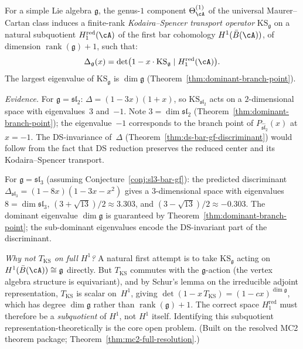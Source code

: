 \begin{conjecture}
\label{conj:discriminant-ks-operator}
For a simple Lie algebra $\mathfrak{g}$, the genus-$1$ component
$\Theta_{\cA}^{(1)}$ of the universal Maurer--Cartan class
induces a finite-rank \emph{Kodaira--Spencer transport operator}
$\mathrm{KS}_{\mathfrak{g}}$ on a natural subquotient
$H^{\mathrm{red}}_1(\cA)$ of the first bar cohomology
$H^1(\bar{B}(\cA))$, of dimension
$\operatorname{rank}(\mathfrak{g}) + 1$, such that:
\begin{equation}\label{eq:discriminant-ks-operator}
\Delta_{\mathfrak{g}}(x)
= \det\bigl(1 - x \cdot \mathrm{KS}_{\mathfrak{g}}
  \mid H^{\mathrm{red}}_1(\cA)\bigr).
\end{equation}
The largest eigenvalue of $\mathrm{KS}_{\mathfrak{g}}$ is
$\dim\mathfrak{g}$ (Theorem~\ref{thm:dominant-branch-point}).

\noindent\emph{Evidence.}
For $\mathfrak{g} = \mathfrak{sl}_2$:
$\Delta = (1-3x)(1+x)$, so
$\mathrm{KS}_{\mathfrak{sl}_2}$
acts on a $2$-dimensional space with eigenvalues~$3$
and~$-1$.  Note $3 = \dim \mathfrak{sl}_2$
(Theorem~\ref{thm:dominant-branch-point}); the
eigenvalue~$-1$ corresponds to the branch point of
$P_{\widehat{\mathfrak{sl}}_2}(x)$ at $x = -1$.
The DS-invariance of~$\Delta$
(Theorem~\ref{thm:ds-bar-gf-discriminant}) would follow
from the fact that DS reduction preserves the reduced center
and its Kodaira--Spencer transport.

For $\mathfrak{g} = \mathfrak{sl}_3$ (assuming
Conjecture~\ref{conj:sl3-bar-gf}):
the predicted discriminant
$\Delta_{\mathfrak{sl}_3} = (1 - 8x)(1 - 3x - x^2)$
gives a $3$-dimensional space with eigenvalues~$8 = \dim \mathfrak{sl}_3$,
$(3 {+} \sqrt{13})/2 \approx 3.303$, and
$(3 {-} \sqrt{13})/2 \approx -0.303$.
The dominant eigenvalue $\dim\mathfrak{g}$ is guaranteed by
Theorem~\ref{thm:dominant-branch-point}; the sub-dominant
eigenvalues encode the DS-invariant part of the discriminant.

\emph{Why not $T_{\mathrm{KS}}$ on full $H^1$?}
A natural first attempt is to take $\mathrm{KS}_{\mathfrak{g}}$
acting on $H^1(\bar{B}(\cA)) \cong \mathfrak{g}$ directly.
But $T_{\mathrm{KS}}$ commutes with the $\mathfrak{g}$-action
(the vertex algebra structure is equivariant), and by Schur's lemma
on the irreducible adjoint representation, $T_{\mathrm{KS}}$
is scalar on~$H^1$, giving
$\det(1 - x\, T_{\mathrm{KS}}) = (1 - cx)^{\dim\mathfrak{g}}$,
which has degree $\dim\mathfrak{g}$ rather than
$\operatorname{rank}(\mathfrak{g}) + 1$.
The correct space $H^{\mathrm{red}}_1$ must
therefore be a \emph{subquotient} of $H^1$, not $H^1$ itself.
Identifying this subquotient representation-theoretically is the
core open problem.
(Built on the resolved MC2 theorem package; Theorem~\ref{thm:mc2-full-resolution}.)
\end{conjecture}

